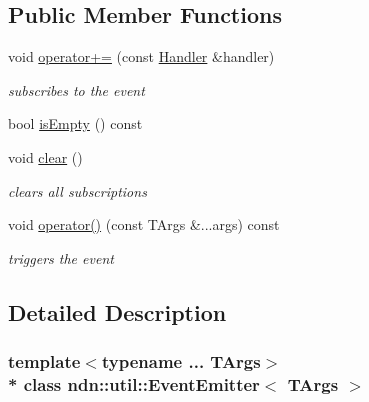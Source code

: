 \subsection*{Public Member Functions}
\begin{DoxyCompactItemize}
\item 
void \hyperlink{classndn_1_1util_1_1EventEmitter_a1cce5c1df26b2914125f66be1914533d}{operator+=} (const \hyperlink{classndn_1_1util_1_1EventEmitter_ad8d47433bcb8c1dbb94a4b6c92362423}{Handler} \&handler)\hypertarget{classndn_1_1util_1_1EventEmitter_a1cce5c1df26b2914125f66be1914533d}{}\label{classndn_1_1util_1_1EventEmitter_a1cce5c1df26b2914125f66be1914533d}

\begin{DoxyCompactList}\small\item\em subscribes to the event \end{DoxyCompactList}\item 
bool \hyperlink{classndn_1_1util_1_1EventEmitter_aec8e56515afa9d7a3d63362db6389fba}{is\+Empty} () const
\item 
void \hyperlink{classndn_1_1util_1_1EventEmitter_a38df8a7e57e188e91b70374f29fbba89}{clear} ()\hypertarget{classndn_1_1util_1_1EventEmitter_a38df8a7e57e188e91b70374f29fbba89}{}\label{classndn_1_1util_1_1EventEmitter_a38df8a7e57e188e91b70374f29fbba89}

\begin{DoxyCompactList}\small\item\em clears all subscriptions \end{DoxyCompactList}\item 
void \hyperlink{classndn_1_1util_1_1EventEmitter_acf11bda10db9558547fc59695db6c8e7}{operator()} (const T\+Args \&...args) const\hypertarget{classndn_1_1util_1_1EventEmitter_acf11bda10db9558547fc59695db6c8e7}{}\label{classndn_1_1util_1_1EventEmitter_acf11bda10db9558547fc59695db6c8e7}

\begin{DoxyCompactList}\small\item\em triggers the event \end{DoxyCompactList}\end{DoxyCompactItemize}


\subsection{Detailed Description}
\subsubsection*{template$<$typename ... T\+Args$>$\\*
class ndn\+::util\+::\+Event\+Emitter$<$ T\+Args $>$}

